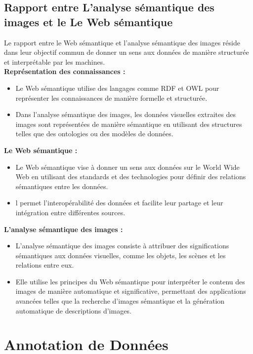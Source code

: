 \subsection{Rapport entre L'analyse sémantique des images et le Le Web sémantique}
Le rapport entre le Web sémantique et l'analyse sémantique des images réside dans leur objectif commun de donner un sens aux données de manière structurée et interprétable par les machines. \\

\textemdash \textbf{ Représentation des connaissances :}
\begin{itemize}
	\item Le Web sémantique utilise des langages comme RDF et OWL pour représenter les connaissances de manière formelle et structurée.
	\item Dans l'analyse sémantique des images, les données visuelles extraites des images sont représentées de manière sémantique en utilisant des structures telles que des ontologies ou des modèles de données.
\end{itemize}

\textemdash \textbf{ Le Web sémantique :}
\begin{itemize}
	\item Le Web sémantique vise à donner un sens aux données sur le World Wide Web en utilisant des standards et des technologies pour définir des relations sémantiques entre les données.
	\item l permet l'interopérabilité des données et facilite leur partage et leur intégration entre différentes sources.
\end{itemize}

\textemdash \textbf{ L'analyse sémantique des images :}
\begin{itemize}
	\item L'analyse sémantique des images consiste à attribuer des significations sémantiques aux données visuelles, comme les objets, les scènes et les relations entre eux.
	\item Elle utilise les principes du Web sémantique pour interpréter le contenu des images de manière automatique et significative, permettant des applications avancées telles que la recherche d'images sémantique et la génération automatique de descriptions d'images.
\end{itemize}

\section{Annotation de Données}
